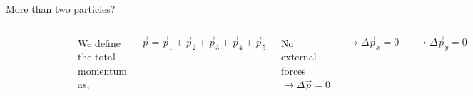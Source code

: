 \documentclass[]{beamer}
\begin{document}
\begin{frame}
More than two particles?

\vspace{3mm}

\pause


  \begin{columns}[c]
    \column{2in}  %
   
    \begin{figure}[h!]  
        \includegraphics[width=1.\textwidth]{images/3.jpg}
      
      \end{figure}

      
    \column{2in}
 


    We define the total momentum as,

\begin{equation*}
    \vec p= \vec p_1+\vec p_2+\vec p_3+\vec p_4+\vec p_5
\end{equation*}

\pause
No external forces $\rightarrow \Delta \vec p=0$

\pause


\begin{equation*}
    \rightarrow \Delta \vec p_x= 0
\end{equation*}

\begin{equation*}
    \rightarrow \Delta \vec p_y= 0
\end{equation*}


    \end{columns}




  \end{frame}
                
\end{document}
